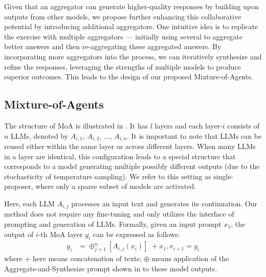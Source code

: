 \documentclass{article}
\begin{document}
Given that an aggregator can generate higher-quality responses by building upon outputs from other models, 
we propose further enhancing this collaborative potential by introducing additional aggregators. 
One intuitive idea is to replicate the exercise with multiple aggregators 
— initially using several to aggregate better answers and then re-aggregating these aggregated answers.
By incorporating more aggregators into the process, we can iteratively synthesize and refine the responses,
leveraging the strengths of multiple models to produce superior outcomes.
This leads to the design of our proposed Mixture-of-Agents.

\subsection{Mixture-of-Agents}

The structure of MoA is illustrated in .
It has \(l\) layers and each layer-\(i\) consists of \(n\) LLMs, denoted by \(A_{i,1}\), \(A_{i,2}\), ..., \(A_{i,n}\).
It is important to note that LLMs can be reused either within the same layer or across different layers. 
When many LLMs in a layer are identical, 
this configuration leads to a special structure that corresponds to a  model generating multiple possibly different outputs (due to the stochasticity of temperature sampling). 
We refer to this setting as single-proposer, where only a sparse subset of models are activated.

Here, each LLM \(A_{i,j}\) processes an input text and generates its continuation.
Our method does not require any fine-tuning and only utilizes the interface of prompting and generation of LLMs. 
Formally, given an input prompt \(x_1\), the output of \(i\)-th MoA layer \(y_i\) can be expressed as follows:
\begin{align}
    y_{i} &= \oplus_{j=1}^n [ A_{i,j}(x_i)] \,\, + x_1, x_{i+1} = y_{i}
    \label{eq:mom}
\end{align}
where $+$ here means concatenation of texts; $\oplus$ means application of the Aggregate-and-Synthesize prompt shown in  to these model outputs. 
\end{document}
